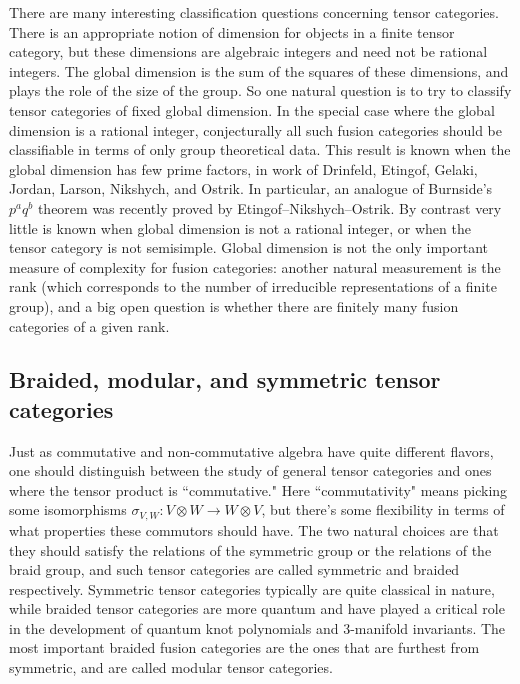 \documentclass[12pt]{article}
\begin{document}
There are many interesting classification questions concerning tensor categories. There is an appropriate notion of dimension for objects in a finite tensor category, but these dimensions are algebraic integers and need not be rational integers. The global dimension is the sum of the squares of these dimensions, and plays the role of the size of the group. So one natural question is to try to classify tensor categories of fixed global dimension. In the special case where the global dimension is a rational integer, conjecturally all such fusion categories should be classifiable in terms of only group theoretical data.  This result is known when the global dimension has few prime factors, in work of Drinfeld, Etingof, Gelaki, Jordan, Larson, Nikshych, and Ostrik. In particular, an analogue of Burnside's $p^a q^b$ theorem was recently proved by Etingof--Nikshych--Ostrik. By contrast very little is known when global dimension is not a rational integer, or when the tensor category is not semisimple. Global dimension is not the only important measure of complexity for fusion categories: another natural measurement is the rank (which corresponds to the number of irreducible representations of a finite group), and a big open question is whether there are finitely many fusion categories of a given rank.


\subsection{Braided, modular, and symmetric tensor categories}
Just as  commutative and non-commutative algebra have quite different flavors, one should distinguish between the study of general tensor categories and ones where the tensor product is ``commutative." Here ``commutativity" means picking some isomorphisms $\sigma_{V,W}: V \otimes W \rightarrow W \otimes V$, but there's some flexibility in terms of what properties these commutors should have. The two natural choices are that they should satisfy the relations of the symmetric group or the relations of the braid group, and such tensor categories are called symmetric and braided respectively. Symmetric tensor categories typically are quite classical in nature, while braided tensor categories are more quantum and have played a critical role in the development of quantum knot polynomials and 3-manifold invariants. The most important braided fusion categories are the ones that are furthest from symmetric, and are called modular tensor categories.
\end{document}
